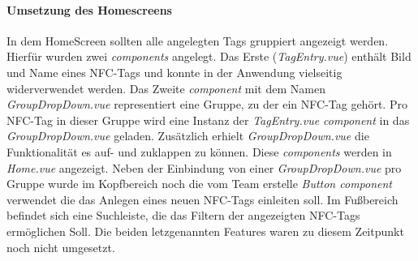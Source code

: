 \documentclass[10pt, a4paper]{article}
\begin{document}
\paragraph*{Umsetzung des Homescreens}
In dem HomeScreen sollten alle angelegten Tags gruppiert angezeigt werden. Hierfür wurden zwei \textit{components} angelegt. Das Erste (\textit{TagEntry.vue})
enthält Bild und Name eines NFC-Tags und konnte in der Anwendung vielseitig widerverwendet werden. Das Zweite \textit{component} mit dem Namen
\textit{GroupDropDown.vue} representiert eine Gruppe, zu der ein NFC-Tag gehört. Pro NFC-Tag in dieser Gruppe wird eine Instanz der
\textit{TagEntry.vue component} in das \textit{GroupDropDown.vue} geladen. Zusätzlich erhielt \textit{GroupDropDown.vue} die Funktionalität es auf- und
zuklappen zu können. Diese \textit{components} werden in \textit{Home.vue} angezeigt. Neben der Einbindung von einer \textit{GroupDropDown.vue} pro Gruppe
wurde im Kopfbereich noch die vom Team erstelle \textit{Button component} verwendet die das Anlegen eines neuen NFC-Tags einleiten soll. Im Fußbereich befindet
sich eine Suchleiste, die das Filtern der angezeigten NFC-Tags ermöglichen Soll. Die beiden letzgenannten Features waren zu diesem Zeitpunkt noch nicht umgesetzt.
\end{document}
